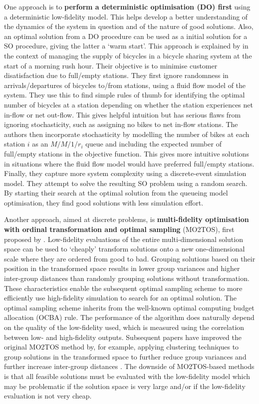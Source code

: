 \documentclass[12pt,a4paper]{article}
\begin{document}
One approach is to \textbf{perform a deterministic optimisation (DO) first} using a deterministic low-fidelity model. This helps develop a better understanding of the dynamics of the system in question and of the nature of good solutions. Also, an optimal solution from a DO procedure can be used as a initial solution for a SO procedure, giving the latter a `warm start'. This approach is explained by \cite{jian2015introduction} in the context of managing the supply of bicycles in a bicycle sharing system at the start of a morning rush hour. Their objective is to minimise customer disatisfaction due to full/empty stations. They first ignore randomness in arrivals/departures of bicycles to/from stations, using a fluid flow model of the system. They use this to find simple rules of thumb for identifying the optimal number of bicycles at a station depending on whether the station experiences net in-flow or net out-flow. This gives helpful intuition but has serious flaws from ignoring stochasticity, such as assigning no bikes to net in-flow stations. The authors then incorporate stochasticity by modelling the number of bikes at each station $i$ as an $M/M/1/r_i$ queue and including the expected number of full/empty stations in the objective function. This gives more intuitive solutions in situations where the fluid flow model would have preferred full/empty stations. Finally, they capture more system complexity using a discrete-event simulation model. They attempt to solve the resulting SO problem using a random search. By starting their search at the optimal solution from the queueing model optimisation, they find good solutions with less simulation effort.

Another approach, aimed at discrete problems, is \textbf{multi-fidelity optimisation with ordinal transformation and optimal sampling} (MO2TOS), first proposed by \cite{xu2016mo2tos}. Low-fidelity evaluations of the entire multi-dimensional solution space can be used to `cheaply' transform solutions onto a new one-dimensional scale where they are ordered from good to bad. Grouping solutions based on their position in the transformed space results in lower group variances and higher inter-group distances than randomly grouping solutions without transformation. These characteristics enable the subsequent optimal sampling scheme to more efficiently use high-fidelity simulation to search for an optimal solution. The optimal sampling scheme inherits from the well-known optimal computing budget allocation (OCBA) rule. The performance of the algorithm does naturally depend on the quality of the low-fidelity used, which is measured using the correlation between low- and high-fidelity outputs. Subsequent papers have improved the original MO2TOS method by, for example, applying clustering techniques to group solutions in the transformed space to further reduce group variances and further increase inter-group distances \citep{cao2023cluster}. The downside of MO2TOS-based methods is that all feasible solutions must be evaluated with the low-fidelity model which may be problematic if the solution space is very large and/or if the low-fidelity evaluation is not very cheap.
\end{document}
